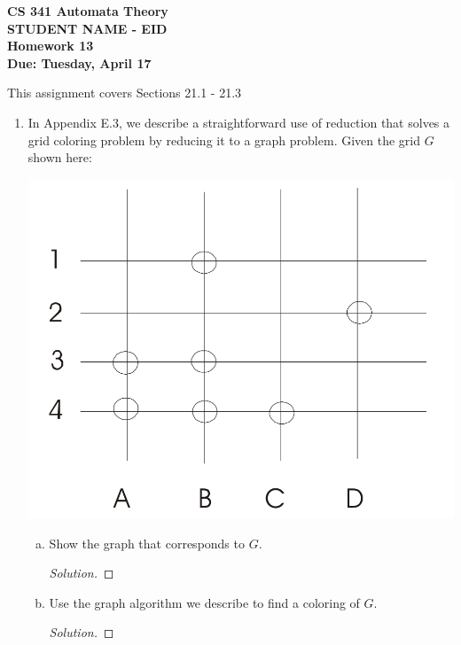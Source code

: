 \documentclass[10pt]{article}
\begin{document}
\begin{flushleft}
\textbf{\noindent
CS 341 Automata Theory \\
STUDENT NAME - EID\\
Homework 13 \\
Due: Tuesday, April 17}\\
\end{flushleft}

\noindent
This assignment covers Sections 21.1 - 21.3\\

\begin{enumerate}[1)]


\item
In Appendix E.3, we describe a straightforward use of reduction that solves a grid coloring problem by reducing it to a graph problem.  Given the grid $G$ shown here:
\begin{center}
\includegraphics[scale=.15]{images/p1.png}
\end{center}
\begin{enumerate}[a)]

\item
Show the graph that corresponds to $G$.
\begin{proof}[Solution]
\end{proof}

\item
Use the graph algorithm we describe to find a coloring of $G$.
\begin{proof}[Solution]
\end{proof}
\end{enumerate}



\end{enumerate}
\end{document}
